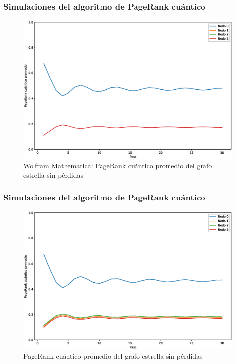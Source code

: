 \documentclass[xetex,mathserif,serif, 8pt]{beamer}
\begin{document}
\begin{frame}
    \frametitle{Simulaciones del algoritmo de PageRank cuántico}

    \begin{figure}[H]
        \centering
        \includegraphics[width=0.9\linewidth]{img/star-mean-M.eps}
        \caption{Wolfram Mathematica: PageRank cuántico promedio del grafo estrella sin pérdidas}
    \end{figure}

\end{frame}

\begin{frame}
    \frametitle{Simulaciones del algoritmo de PageRank cuántico}

    \begin{figure}[H]
        \centering
        \includegraphics[width=0.9\linewidth]{img/star-mean-lossless.eps}
        \caption{PageRank cuántico promedio del grafo estrella sin pérdidas}
    \end{figure}

\end{frame}
\end{document}
